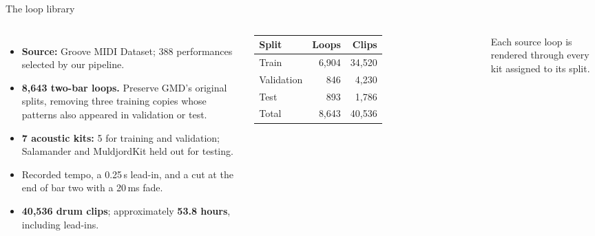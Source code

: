 \begin{frame}{The loop library}

  \begin{columns}[T,onlytextwidth]
      \small
      \begin{itemize}
        \item \textbf{Source:} Groove MIDI Dataset;
          388 performances selected by our pipeline.

        \item \textbf{8,643 two-bar loops.}
          Preserve GMD's original splits, removing three
          training copies whose patterns also appeared
          in validation or test.

        \item \textbf{7 acoustic kits:}
          5 for training and validation;
          Salamander and MuldjordKit held out for testing.

        \item Recorded tempo, a 0.25\,s lead-in,
          and a cut at the end of bar two with a 20\,ms fade.

        \item \textbf{40,536 drum clips};
          approximately \textbf{53.8 hours},
          including lead-ins.
      \end{itemize}

      \centering
      \small
      \begin{tabular}{lrr}
        \hline
        \textbf{Split} & \textbf{Loops} & \textbf{Clips} \\
        \hline
        Train      & 6,904 & 34,520 \\
        Validation &   846 &  4,230 \\
        Test       &   893 &  1,786 \\
        \hline
        Total      & 8,643 & 40,536 \\
        \hline
      \end{tabular}

      \vspace{0.4cm}
      {\footnotesize
        Each source loop is rendered through
        every kit assigned to its split.
      }
  \end{columns}

\end{frame}

